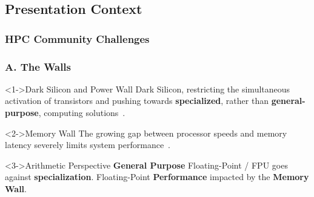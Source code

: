 \graphicspath{{../../../PhD/paper_factory/thesis_louis/Chapter2/Figs/}{./figs/}}
\subsection{Presentation Context}
\begin{frame}
    \frametitle{HPC Community Challenges}


\end{frame}

\begin{frame}
    \frametitle{A. The Walls}

    \begin{alertblock}<1->{Dark Silicon and Power Wall}
	    Dark Silicon, restricting the simultaneous activation of transistors and pushing towards \textbf{specialized}, rather than \textbf{general-purpose}, computing solutions~\cite{shafique_eda_2014}.
    \end{alertblock}

    \begin{alertblock}<2->{Memory Wall}
        The growing gap between processor speeds and memory latency severely limits system performance~\cite{dennard_design_1999}.
    \end{alertblock}

    \begin{block}<3->{Arithmetic Perspective}
	    \textbf{General Purpose} Floating-Point / FPU goes against \textbf{specialization}.
	    Floating-Point \textbf{Performance} impacted by the \textbf{Memory Wall}.
    \end{block}

\end{frame}


